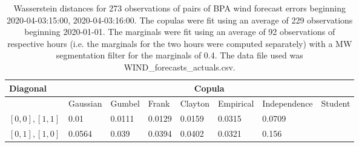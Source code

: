 \begin{table}[h] 
    \centering 
    \begin{tabular}{|l|l|l|l|l|l|l|l|} \hline 
        \textbf{Diagonal} & \multicolumn{7}{c|}{\textbf{Copula}} \\ \hline 
        & Gaussian & Gumbel & Frank & Clayton & Empirical & Independence & Student \\ \hline 
        $[0,0], [1,1]$ & 0.01 & 0.0111 & 0.0129 & 0.0159 & 0.0315 & 0.0709 &  \\ \hline 
        $[0,1], [1,0]$ & 0.0564 & 0.039 & 0.0394 & 0.0402 & 0.0321 & 0.156 &  \\ \hline 
    \end{tabular} 
    \caption{Wasserstein distances for 273 observations of pairs of BPA wind forecast errors beginning 2020-04-03:15:00, 2020-04-03:16:00. The copulas were fit  using an average of 229 observations beginning 2020-01-01. The marginals were fit using an average of 92 observations of respective hours (i.e. the  marginals for the two hours were computed separately) with a MW segmentation filter for the marginals of 0.4. The data file used was WIND\_forecasts\_actuals.csv.} 
\end{table}